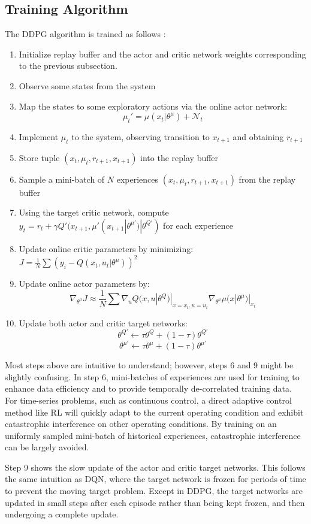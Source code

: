 \subsection{Training Algorithm}
The DDPG algorithm is trained as follows \cite{ddpg}:
\begin{enumerate}
    \item Initialize replay buffer and the actor and critic network weights corresponding to the previous subsection.
    \item Observe some states from the system 
    \item Map the states to some exploratory actions via the online actor network: $$\mu_t' = \mu (x_t | \theta ^{\mu}) + \mathcal{N}_t$$
    \item Implement $\mu_t$ to the system, observing transition to $x_{t+1}$ and obtaining $r_{t+1}$
    \item Store tuple $(x_t, \mu_t, r_{t+1}, x_{t+1})$ into the replay buffer
    \item Sample a mini-batch of $N$ experiences $(x_t, \mu_t, r_{t+1}, x_{t+1})$ from the replay buffer
    \item Using the target critic network, compute $y_t = r_t + \gamma Q'(x_{t+1}, \mu'(x_{t+1}|\theta^{\mu'})|\theta ^{Q'})$ for each experience
    \item Update online critic parameters by minimizing: $J = \frac{1}{N}\sum(y_i - Q(x_t, u_t|\theta^{\mu}))^2$
    \item Update online actor parameters by:
    $$\nabla_{\theta^{\mu}} J \approx \frac{1}{N}\sum \nabla_u Q(x, u|\theta^Q)|_{x = x_t, u = u_t}\nabla_{\theta^{\mu}}\mu (x | \theta^{\mu})|_{x_t}$$
    \item Update both actor and critic target networks:
    $$\theta^{Q'} \leftarrow \tau \theta^Q + (1 - \tau) \theta^{Q'}$$
    $$\theta^{\mu'} \leftarrow \tau \theta^{\mu} + (1 - \tau) \theta^{\mu'}$$
\end{enumerate}

Most steps above are intuitive to understand; however, steps 6 and 9 might be slightly confusing. In step 6, mini-batches of experiences are used for training to enhance data efficiency and to provide temporally de-correlated training data.  For time-series problems, such as continuous control, a direct adaptive control method like RL will quickly adapt to the current operating condition and exhibit catastrophic interference on other operating conditions.  By training on an uniformly sampled mini-batch of historical experiences, catastrophic interference can be largely avoided.

Step 9 shows the slow update of the actor and critic target networks.  This follows the same intuition as DQN, where the target network is frozen for periods of time to prevent the moving target problem.  Except in DDPG, the target networks are updated in small steps after each episode rather than being kept frozen, and then undergoing a complete update.



